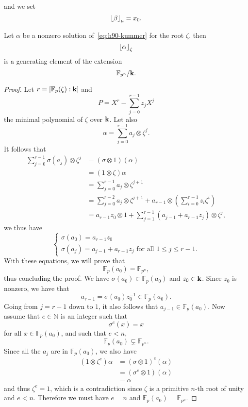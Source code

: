  and we set
 \[
   \left\lfloor \beta \right\rfloor_{\mu} = x_0.
 \]
 \begin{prop}
   \label{prop:generate}
   Let $\alpha$ be a nonzero solution of~\eqref{eq:h90-kummer} for the root
   $\zeta$, then
   \[
     \left\lfloor \alpha \right\rfloor_{\zeta}
   \]
   is a generating element of the extension
   \[
     \mathbb{F}_{p^n}/\mathbf{k}.
   \]
 \end{prop}
 \begin{proof}
   Let $r=\left[ \mathbb{F}_{p}(\zeta):\mathbf{k} \right]$ and
   \[
     P = X^r - \sum_{j=0}^{r-1}z_j X^j
   \]
   the minimal polynomial of $\zeta$ over $\mathbf{k}$. Let also
   \[
     \alpha = \sum_{j=0}^{r-1}a_j\otimes\zeta^j.
   \]
   It follows that 
   \begin{align*}
     \sum_{j=0}^{r-1}\sigma(a_j)\otimes\zeta^j &=(\sigma\otimes1)(\alpha)\\
     &= (1\otimes\zeta)\alpha\\
     &= \sum_{j=0}^{r-1}a_j\otimes\zeta^{j+1}\\
     &= \sum_{j=0}^{r-2}a_j\otimes\zeta^{j+1} +
     a_{r-1}\otimes(\sum_{i=0}^{r-1}z_i\zeta^i)\\
     &= a_{r-1}z_0\otimes 1 +
     \sum_{j=1}^{r-1}(a_{j-1}+a_{r-1}z_j)\otimes\zeta^j,
   \end{align*}
   we thus have
   \[
   \left\{ 
     \begin{array}{l}
       \sigma(a_0) = a_{r-1}z_0 \\
       \sigma(a_j) = a_{j-1}+a_{r-1}z_j\text{ for all }1\leq j\leq r-1.
     \end{array}
   \right.
 \]
 With these equations, we will prove that
 \[
   \mathbb{F}_p(a_0) = \mathbb{F}_{p^n},
 \]
 thus concluding the proof. We have $\sigma(a_0)\in\mathbb{F}_p(a_0)$ and
 $z_0\in\mathbf{k}$. Since $z_0$ is nonzero, we have that
 \[
   a_{r-1} = \sigma(a_0)z_0^{-1}\in\mathbb{F}_p(a_0).
 \]
 Going from $j=r-1$ down to $1$, it also follows that
 $a_{j-1}\in\mathbb{F}_{p}(a_0)$. Now assume that $e\in\mathbb{N}$ is an integer
 such that
 \[
   \sigma^e(x) = x
 \]
 for all $x\in\mathbb{F}_p(a_0)$, and such that $e<n$, \ie
 \[
   \mathbb{F}_p(a_0)\subsetneq \mathbb{F}_{p^n}.
 \]
 Since all the $a_j$ are in $\mathbb{F}_{p}(a_0)$, we also have
 \begin{align*}
  (1\otimes\zeta^e)\alpha &= (\sigma\otimes1)^e(\alpha)\\
  &= (\sigma^e\otimes1)(\alpha)\\
  &= \alpha
 \end{align*}
 and thus $\zeta^e=1$, which is a contradiction since $\zeta$ is a primitive
 $n$-th root of unity and $e<n$. Therefore we must have $e=n$ and
 $\mathbb{F}_p(a_0) = \mathbb{F}_{p^n}$.
 \end{proof}
